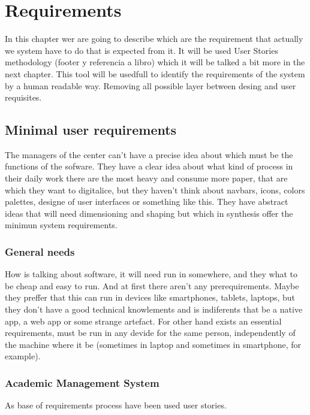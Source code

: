 \chapter{Requirements}

In this chapter wer are going to describe which are the requirement that
actually we system have to do that is expected from it.
It will be used User Stories methodology (footer y referencia a libro) which
it will be talked a bit more in the next chapter.
This tool will be usedfull to identify the requirements of the system by a
human readable way. Removing all possible layer between desing and user requisites.

\section{Minimal user requirements}

The managers of the center can't have a precise idea about which must be the functions of the sofware. They have a clear idea about what kind of process in their daily work there are the most heavy and consume more paper, that are which they want to digitalice, but they haven't think about navbars, icons, colors palettes, designe of user interfaces or something like this.  They have abstract ideas that will need dimensioning and shaping but which in synthesis offer the minimun system requirements.

\subsection{General needs}
How is talking about software, it will need run in somewhere, and they what to be cheap and easy to run. And at first there aren't any prerequirements. Maybe they preffer that this can run in devices like smartphones, tablets, laptops, but they don't have a good technical knowlements and is indiferents that be a native app, a web app or some strange artefact.
For other hand exists an essential requirements, must be run in any devide for the same person, independently of the machine where it be (sometimes in laptop and sometimes in smartphone, for example).

\subsection{Academic Management System}


As base of requirements process have been used user stories.

